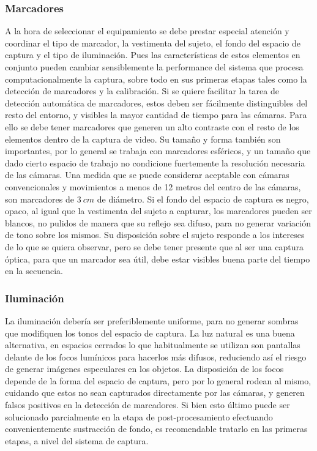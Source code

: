 \subsubsection{Marcadores}
A la hora de seleccionar el equipamiento se debe prestar especial atención y coordinar el tipo de marcador, la vestimenta del sujeto, el fondo del espacio de captura y el tipo de iluminación. Pues las características de estos elementos en conjunto pueden cambiar sensiblemente la performance del sistema que procesa computacionalmente la captura, sobre todo en sus primeras etapas tales como la detección de marcadores y la  calibración.
Si se quiere facilitar la tarea de detección automática de marcadores, estos deben ser fácilmente distinguibles del resto del entorno, y visibles la mayor cantidad de tiempo para las cámaras. Para ello se debe tener marcadores que generen un alto contraste con el resto de los elementos dentro de la captura de video. 
Su tamaño y forma también son importantes, por lo general se trabaja con marcadores esféricos, y un tamaño que dado cierto espacio de trabajo no condicione fuertemente la resolución necesaria de las cámaras. Una medida que se puede considerar aceptable con cámaras convencionales y movimientos a menos de 12 metros del centro de las cámaras, son marcadores de $3~cm$ de diámetro.  
Si el fondo del espacio de captura es negro, opaco, al igual que la vestimenta del sujeto a capturar, los marcadores pueden ser blancos, no pulidos de manera que su reflejo sea difuso, para no generar variación de tono sobre los mismos. 
Su disposición sobre el sujeto responde a los intereses de lo que se quiera observar, pero se debe tener presente que al ser una captura óptica, para que un marcador sea útil, debe estar visibles buena parte del tiempo en la secuencia.

\subsubsection{Iluminación}
La iluminación debería ser preferiblemente uniforme, para no generar sombras que modifiquen los tonos del espacio de captura. La luz natural es una buena alternativa, en espacios cerrados lo que habitualmente se utilizan son pantallas delante de los focos lumínicos para hacerlos más difusos, reduciendo así el riesgo de generar imágenes especulares en los objetos. La disposición de los focos depende de la forma del espacio de captura, pero por lo general rodean al mismo, cuidando que estos no sean capturados directamente por las cámaras, y generen falsos positivos en la detección de marcadores. Si bien esto último puede ser solucionado parcialmente en la etapa de  post-procesamiento efectuando convenientemente sustracción de fondo, es recomendable tratarlo en las primeras etapas, a nivel del sistema de captura. 

